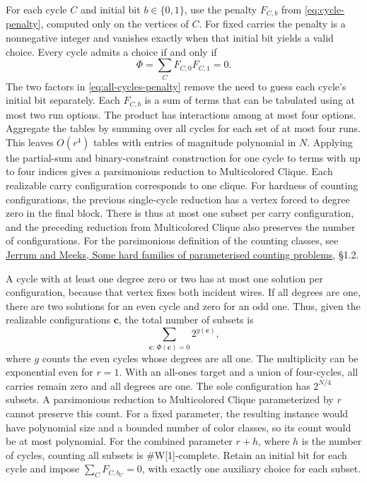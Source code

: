 \documentclass[11pt,a4paper]{article}
\numberwithin{equation}{section}
\begin{document}
For each cycle \(C\) and initial bit \(b\in\{0,1\}\), use the penalty \(F_{C,b}\) from \eqref{eq:cycle-penalty}, computed only on the vertices of \(C\). For fixed carries the penalty is a nonnegative integer and vanishes exactly when that initial bit yields a valid choice. Every cycle admits a choice if and only if
\begin{equation}\label{eq:all-cycles-penalty}
\Phi=\sum_C F_{C,0}F_{C,1}=0 .
\end{equation}
The two factors in \eqref{eq:all-cycles-penalty} remove the need to guess each cycle's initial bit separately. Each \(F_{C,b}\) is a sum of terms that can be tabulated using at most two run options. The product has interactions among at most four options. Aggregate the tables by summing over all cycles for each set of at most four runs. This leaves \(O(r^4)\) tables with entries of magnitude polynomial in \(N\). Applying the partial-sum and binary-constraint construction for one cycle to terms with up to four indices gives a parsimonious reduction to Multicolored Clique. Each realizable carry configuration corresponds to one clique. For hardness of counting configurations, the previous single-cycle reduction has a vertex forced to degree zero in the final block. There is thus at most one subset per carry configuration, and the preceding reduction from Multicolored Clique also preserves the number of configurations. For the parsimonious definition of the counting classes, see \href{https://eprints.gla.ac.uk/97129/1/97129.pdf}{Jerrum and Meeks, Some hard families of parameterised counting problems}, §1.2.

A cycle with at least one degree zero or two has at most one solution per configuration, because that vertex fixes both incident wires. If all degrees are one, there are two solutions for an even cycle and zero for an odd one. Thus, given the realizable configurations \(\mathbf c\), the total number of subsets is
\begin{equation}\label{eq:weighted-subset-count}
\sum_{\mathbf c:\,\Phi(\mathbf c)=0}2^{g(\mathbf c)},
\end{equation}
where \(g\) counts the even cycles whose degrees are all one. The multiplicity can be exponential even for \(r=1\). With an all-ones target and a union of four-cycles, all carries remain zero and all degrees are one. The sole configuration has \(2^{N/4}\) subsets. A parsimonious reduction to Multicolored Clique parameterized by \(r\) cannot preserve this count. For a fixed parameter, the resulting instance would have polynomial size and a bounded number of color classes, so its count would be at most polynomial. For the combined parameter \(r+h\), where \(h\) is the number of cycles, counting all subsets is \#W{[}1{]}-complete. Retain an initial bit for each cycle and impose \(\sum_C F_{C,b_C}=0\), with exactly one auxiliary choice for each subset.
\end{document}
